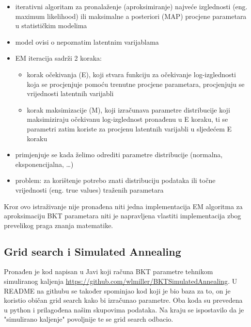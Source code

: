 \begin{itemize}
	\item iterativni algoritam za pronalaženje (aproksimiranje) najveće izglednosti (eng. maximum likelihood) ili maksimalne a posteriori (MAP) procjene parametara u statističkim modelima
	\item model ovisi o nepoznatim latentnim varijablama
	\item EM iteracija sadrži 2 koraka:
	\begin{itemize}
		\item 	korak očekivanja (E), koji stvara funkciju za očekivanje log-izglednosti koja se procjenjuje pomoću trenutne procjene parametara, procjenjuju se vrijednosti latentnih varijabli
		\item 	korak maksimizacije (M), koji izračunava parametre distribucije koji maksimiziraju očekivanu log-izglednost pronađenu u E koraku, ti se parametri zatim koriste za procjenu latentnih varijabli u sljedećem E koraku
	\end{itemize}
	
	\item primjenjuje se kada želimo odrediti parametre distribucije (normalna, eksponencijalna, …)
	\item problem: za korištenje potrebo znati distribuciju podataka ili točne vrijednosti (eng. true values) traženih parametara
	
\end{itemize}
Kroz ovo istraživanje nije pronađena niti jedna implementacija EM algoritma za aproksimaciju BKT parametara niti je napravljena vlastiti implementacija zbog prevelikog praga znanja matematike.

\subsection{Grid search i Simulated Annealing}
Pronađen je kod napisan u Javi koji računa BKT parametre tehnikom simuliranog kaljenja \url{https://github.com/wlmiller/BKTSimulatedAnnealing}. U README na githubu se također spominjao kod koji je bio baza za to, on je koristio običan grid search kako bi izračunao parametre. Oba koda su prevedena u python i prilagođena našim skupovima podataka. Na kraju se ispostavilo da je "simulirano kaljenje" povoljnije te se grid search odbacio.
